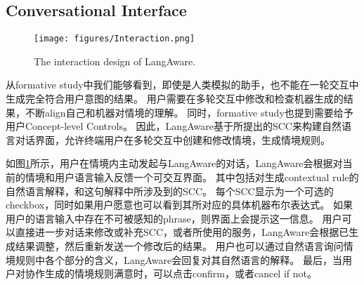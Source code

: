 

\subsection{Conversational Interface}

\begin{figure}
    \centering
    \texttt{[image: figures/Interaction.png]}
    \caption{The interaction design of LangAware.}
    \label{fig:interaction}
\end{figure}

从formative study中我们能够看到，即使是人类模拟的助手，也不能在一轮交互中生成完全符合用户意图的结果。
用户需要在多轮交互中修改和检查机器生成的结果，不断align自己和机器对情境的理解。
同时，formative study也提到需要给予用户Concept-level Controls。
因此，LangAware基于所提出的SCC来构建自然语言对话界面，允许终端用户在多轮交互中创建和修改情境，生成情境规则。

如图\ref{fig:interaction}所示，用户在情境内主动发起与LangAware的对话，LangAware会根据对当前的情境和用户语言输入反馈一个可交互界面。
其中包括对生成contextual rule的自然语言解释，和这句解释中所涉及到的SCC。
每个SCC显示为一个可选的checkbox，同时如果用户愿意也可以看到其所对应的具体机器布尔表达式。
如果用户的语言输入中存在不可被感知的phrase，则界面上会提示这一信息。
用户可以直接进一步对话来修改或补充SCC，或者所使用的服务，LangAware会根据已生成结果调整，然后重新发送一个修改后的结果。
用户也可以通过自然语言询问情境规则中各个部分的含义，LangAware会回复对其自然语言的解释。
最后，当用户对协作生成的情境规则满意时，可以点击confirm，或者cancel if not。

